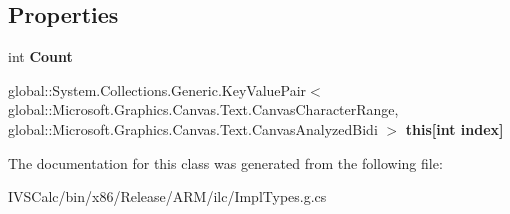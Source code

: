 \subsection*{Properties}
\begin{DoxyCompactItemize}
\item 
\mbox{\label{class_system_1_1_collections_1_1_generic_1_1_i_read_only_list___a___system___collections___gener34ff30f6c6f82400208624c2e473a445_ade712431bd5f4c080026b45c7d7994f9}} 
int {\bfseries Count}
\item 
\mbox{\label{class_system_1_1_collections_1_1_generic_1_1_i_read_only_list___a___system___collections___gener34ff30f6c6f82400208624c2e473a445_a5bae1a055a2a57e3c20942c32a7db088}} 
global\+::\+System.\+Collections.\+Generic.\+Key\+Value\+Pair$<$ global\+::\+Microsoft.\+Graphics.\+Canvas.\+Text.\+Canvas\+Character\+Range, global\+::\+Microsoft.\+Graphics.\+Canvas.\+Text.\+Canvas\+Analyzed\+Bidi $>$ {\bfseries this\mbox{[}int index\mbox{]}}
\end{DoxyCompactItemize}


The documentation for this class was generated from the following file\+:\begin{DoxyCompactItemize}
\item 
I\+V\+S\+Calc/bin/x86/\+Release/\+A\+R\+M/ilc/Impl\+Types.\+g.\+cs\end{DoxyCompactItemize}
